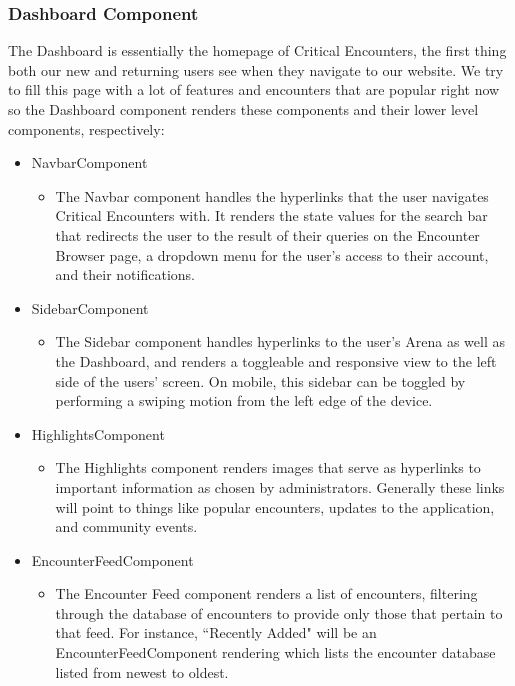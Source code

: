 \documentclass[12pt,a4paper]{report}
\begin{document}
		\subsubsection{Dashboard Component}
		The Dashboard is essentially the homepage of Critical Encounters, the first thing both our new and returning users see when they navigate to our website. We try to fill this page with a lot of features and encounters that are popular right now so the Dashboard component renders these components and their lower level components, respectively:
		\begin{itemize}
			\item NavbarComponent
			\begin{itemize}
				\item The Navbar component handles the hyperlinks that the user navigates Critical Encounters with. It renders the state values for the search bar that redirects the user to the result of their queries on the Encounter Browser page, a dropdown menu for the user's access to their account, and their notifications. 
			\end{itemize}
			\item SidebarComponent
			\begin{itemize}
				\item The Sidebar component handles hyperlinks to the user's Arena as well as the Dashboard, and renders a toggleable and responsive view to the left side of the users' screen. On mobile, this sidebar can be toggled by performing a swiping motion from the left edge of the device.
			\end{itemize}
			\item HighlightsComponent
			\begin{itemize}
				\item The Highlights component renders images that serve as hyperlinks to important information as chosen by administrators. Generally these links will point to things like popular encounters, updates to the application, and community events.
			\end{itemize}
			\item EncounterFeedComponent
			\begin{itemize}
				\item The Encounter Feed component renders a list of encounters, filtering through the database of encounters to provide only those that pertain to that feed. For instance, ``Recently Added" will be an EncounterFeedComponent rendering which lists the encounter database listed from newest to oldest.
			\end{itemize}
		\end{itemize}
		\newpage
\end{document}
